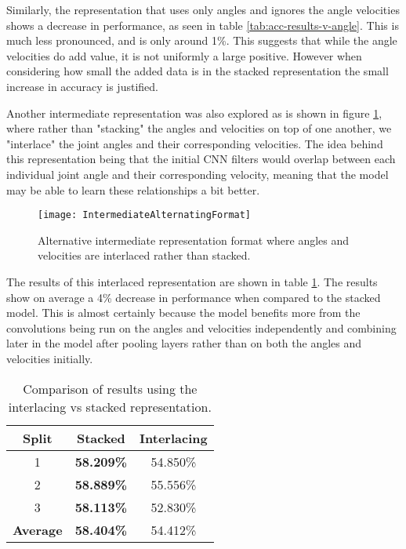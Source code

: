 Similarly, the representation that uses only angles and ignores the angle velocities shows a decrease in performance, as seen in table \ref{tab:acc-results-v-angle}. This is much less pronounced, and is only around 1\%. This suggests that while the angle velocities do add value, it is not uniformly a large positive. However when considering how small the added data is in the stacked representation the small increase in accuracy is justified.

Another intermediate representation was also explored as is shown in figure \ref{fig:alternating-intermediate}, where rather than "stacking" the angles and velocities on top of one another, we "interlace" the joint angles and their corresponding velocities. The idea behind this representation being that the initial CNN filters would overlap between each individual joint angle and their corresponding velocity, meaning that the model may be able to learn these relationships a bit better.

\begin{figure}[ht]
	\texttt{[image: IntermediateAlternatingFormat]}
	\centering
	\caption{Alternative intermediate representation format where angles and velocities are interlaced rather than stacked.}
	\label{fig:alternating-intermediate}
\end{figure}

The results of this interlaced representation are shown in table \ref{tab:acc-results-v-alternating}. The results show on average a 4\% decrease in performance when compared to the stacked model. This is almost certainly because the model benefits more from the convolutions being run on the angles and velocities independently and combining later in the model after pooling layers rather than on both the angles and velocities initially.

\begin{table}[ht]
	\centering
	\begin{tabular}{||c c c||} 
		\hline
		\textbf{Split} & \textbf{Stacked} & \textbf{Interlacing} \\ [0.5ex] 
		\hline\hline
		1 & \textbf{58.209\%} & 54.850\% \\ 
		\hline
		2 & \textbf{58.889\%} & 55.556\% \\
		\hline
		3 & \textbf{58.113\%} & 52.830\% \\
		\hline
		\hline
		\textbf{Average} & \textbf{58.404\%} & 54.412\% \\
		\hline
	\end{tabular}
	\caption{Comparison of results using the interlacing vs stacked representation.}
	\label{tab:acc-results-v-alternating}
\end{table}

